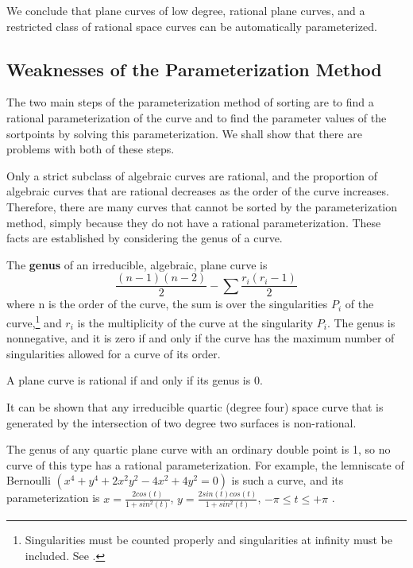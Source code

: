 We conclude that plane curves of low degree, rational plane curves, and
a restricted class of rational space curves can be automatically
parameterized.
%
\subsection{Weaknesses of the Parameterization Method}

The two main steps of the parameterization method of sorting are to find
a rational parameterization of the curve and to find the parameter
values of the sortpoints by solving this parameterization.
We shall show that there are problems with both of these steps.

Only a strict subclass of 
algebraic curves are rational, and the proportion
of algebraic curves that are rational decreases as the order of 
the curve increases.
Therefore, there are many curves that 
cannot be sorted by the parameterization method, simply because they do not
have a rational parameterization.
These facts are established by considering the genus of a curve.
%
\begin{definition}
The {\bf genus} of an irreducible, algebraic, plane curve is
\[ \frac{(n-1)(n-2)}{2} - \sum\frac{r_{i}(r_{i}-1)}{2}\]
where n is the order of the curve,
the sum is over the singularities $P_{i}$ of the curve,\footnote{Singularities
must be counted properly and singularities at infinity must be included.
See \cite[pp. 80-84]{wa}.}
and $r_{i}$ is the multiplicity of the curve at the singularity $P_{i}$.
The genus is nonnegative, and it
is zero if and only if 
the curve has the maximum number of singularities allowed
for a curve of its order.
\end{definition}
%
\begin{theorem}[{\cite[p. 180]{wa}}]
\label{thm-rational}
A plane curve is rational if and only if its genus is 0.
\end{theorem}
%
\begin{example}

It can be shown that any irreducible quartic (degree four) 
space curve that is generated by the intersection
of two degree two surfaces is non-rational.

The genus of any quartic plane curve with an ordinary double point
is 1, so no curve of this type has a rational parameterization.
For example, the lemniscate of Bernoulli
\( (x^{4} + y^{4} + 2x^{2}y^{2} - 4x^{2} + 4y^{2} = 0) \) 
is such a curve, and its parameterization is
\mbox{\( x = \frac{2cos(t)}{1+sin^{2}(t)} \)},
\mbox{\( y = \frac{2sin(t)cos(t)}{1+sin^{2}(t)} \)},
\mbox{\( -\pi \leq t \leq +\pi \)} \cite{lawrence}.
\end{example}

